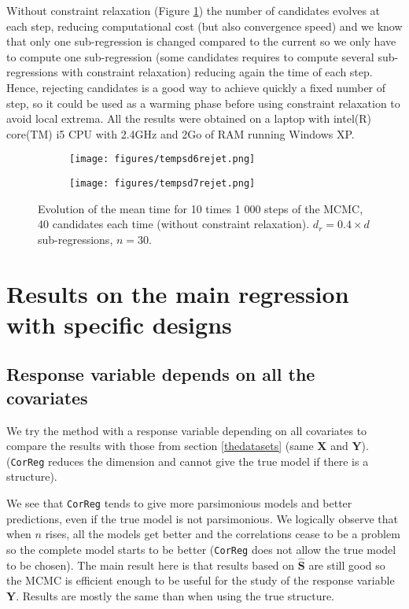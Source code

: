 \documentclass[12pt,a4paper]{report}
\begin{document}
 Without constraint relaxation (Figure \ref{tempsdrejet}) the number of candidates evolves at each step, reducing computational cost (but also convergence speed) and we know that only one sub-regression is changed compared to the current so we only have to compute one sub-regression (some candidates requires to compute several sub-regressions with constraint relaxation) reducing again the time of each step. Hence, rejecting candidates is a good way to achieve quickly a fixed number of step, so it could be used as a warming phase before using constraint relaxation to avoid local extrema. All the results were obtained on a laptop with intel(R) core(TM) i5 CPU with 2.4GHz and 2Go of RAM running Windows XP.
\begin{figure}[h]
\centering
	\begin{subfigure}
	\centering
		\texttt{[image: figures/tempsd6rejet.png]} 
	\end{subfigure}
	\begin{subfigure}
	\centering
		\texttt{[image: figures/tempsd7rejet.png]} 
	\end{subfigure}
	\caption{Evolution of the mean time for 10 times 1 000 steps of the MCMC, 40 candidates each time (without constraint relaxation). $d_r=0.4\times d$ sub-regressions, $n=30$.}\label{tempsdrejet}
\end{figure} 
  
\clearpage
\section{Results on the main regression with specific designs}\label{compY}
\subsection{Response variable depends on all the covariates}	 \label{explsimtout}	
We try the method with a response variable depending on all covariates to compare the results with those from section \ref{thedatasets} (same $\boldsymbol{X}$ and $\boldsymbol{Y}$). ({\tt CorReg} reduces the dimension and cannot give the true model if there is a structure). %

 We see that {\tt CorReg} tends to give more parsimonious models and better predictions, even if the true model is not parsimonious. We logically observe that when $n$ rises, all the models get better and the correlations cease to be a problem so the complete model starts to be better ({\tt CorReg} does not allow the true model to be chosen). The main result here is that results based on $\hat{\boldsymbol{S}}$ are still good so the MCMC is efficient enough to be useful for the study of the response variable $\boldsymbol{Y}$. Results are mostly the same than when using the true structure.\\
 
\end{document}
